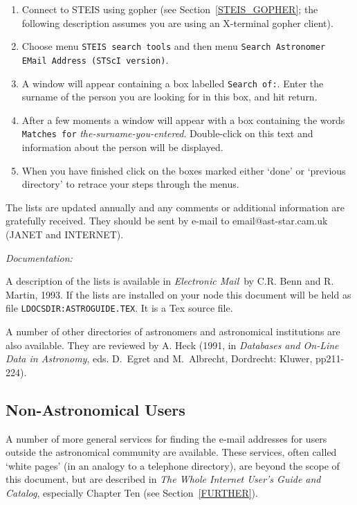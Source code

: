 \documentclass[twoside,11pt,nolof]{starlink}
\begin{document}
\begin{enumerate}

  \item Connect to STEIS using gopher (see Section~\ref{STEIS_GOPHER};
   the following description assumes you are using an X-terminal gopher
   client).

  \item Choose menu \texttt{STEIS search tools} and then menu \texttt{Search Astronomer EMail Address (STScI version)}.

  \item A window will appear containing a box labelled \texttt{Search of:}.
   Enter the surname of the person you are looking for in this box,
   and hit return.

  \item After a few moments a window will appear with a box containing
   the words \texttt{Matches for} \textit{the-surname-you-entered}.
   Double-click on this text and information about the person will be
   displayed.

  \item When you have finished click on the boxes marked either `done'
   or `previous directory' to retrace your steps through the menus.

\end{enumerate}

The lists are updated annually and any comments or additional
information are gratefully received. They should be sent by e-mail
to email@ast-star.cam.uk (JANET and INTERNET).

\textit{Documentation:}

A description of the lists is available in \textit{Electronic Mail}\, by
C.R. Benn and R. Martin, 1993. If the lists are installed on
your node this document will be held as file
\newline \texttt{LDOCSDIR:ASTROGUIDE.TEX}. It is a Tex source file.

A number of other directories of astronomers and astronomical
institutions are also available. They are reviewed by A. Heck (1991, in
\textit{Databases and On-Line Data in Astronomy}, eds. D.~Egret and
M.~Albrecht, Dordrecht: Kluwer, pp211-224).


\subsection{Non-Astronomical Users}

A number of more general services for finding the e-mail addresses for
users outside the astronomical community are available. These services,
often called `white pages' (in an analogy to a telephone directory),
are beyond the scope of this document, but are described in \textit{The
Whole Internet User's Guide and Catalog}, especially Chapter Ten (see
Section~\ref{FURTHER}).
\end{document}
